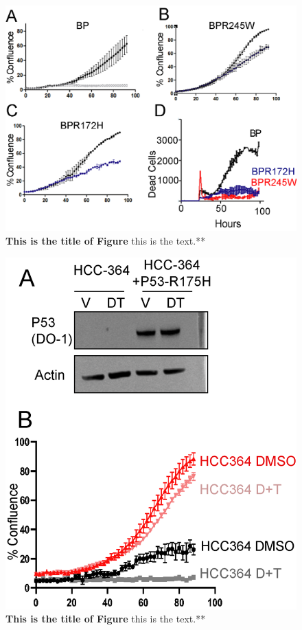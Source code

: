 \begin{figure}
\hypertarget{fig:04}{%
\centering
\includegraphics[width=1\textwidth,height=\textheight]{images/p537.png}
\caption{\textbf{This is the title of Figure} this is the text.**}\label{fig:04}
}
\end{figure}

\begin{figure}
\hypertarget{fig:04}{%
\centering
\includegraphics[width=1\textwidth,height=\textheight]{images/p538.png}
\caption{\textbf{This is the title of Figure} this is the text.**}\label{fig:04}
}
\end{figure}


